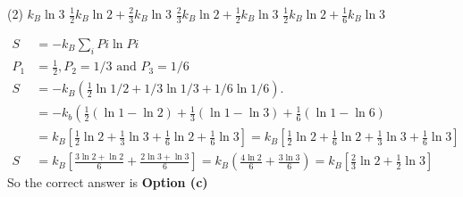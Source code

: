 \begin{enumerate}
	{	}
	\begin{tasks}(2)
		\task[\textbf{a.}] $k_{B} \ln 3$
		\task[\textbf{b.}]$\frac{1}{2} k_{B} \ln 2+\frac{2}{3} k_{B} \ln 3$
		\task[\textbf{c.}]$\frac{2}{3} k_{B} \ln 2+\frac{1}{2} k_{B} \ln 3$
		\task[\textbf{d.}] $\frac{1}{2} k_{B} \ln 2+\frac{1}{6} k_{B} \ln 3$
	\end{tasks}
	\begin{answer}
		\begin{align*}
		S&=-k_{B} \sum_{i} P i \ln P i\\
		P_{1}&=\frac{1}{2}, P_{2}=1 / 3 \text { and } P_{3}=1 / 6 \\
		S&=-k_{B}\left(\frac{1}{2} \ln 1 / 2+1 / 3 \ln 1 / 3+1 / 6 \ln 1 / 6\right) . \\
		&=-k_{b}\left(\frac{1}{2}(\ln 1-\ln 2)+\frac{1}{3}(\ln 1-\ln 3)+\frac{1}{6}(\ln 1-\ln 6)\right. \\
		&=k_{B}\left[\frac{1}{2} \ln 2+\frac{1}{3} \ln 3+\frac{1}{6} \ln 2+\frac{1}{6} \ln 3\right]=k_{B}\left[\frac{1}{2} \ln 2+\frac{1}{6} \ln 2+\frac{1}{3} \ln 3+\frac{1}{6} \ln 3\right] \\
		S&=k_{B}\left[\frac{3 \ln 2+\ln 2}{6}+\frac{2 \ln 3+\ln 3}{6}\right]=k_{B}\left(\frac{4 \ln 2}{6}+\frac{3 \ln 3}{6}\right)=k_{B}\left[\frac{2}{3} \ln 2+\frac{1}{2} \ln 3\right]
		\end{align*}
		So the correct answer is \textbf{Option (c)}
	\end{answer}
\end{enumerate}